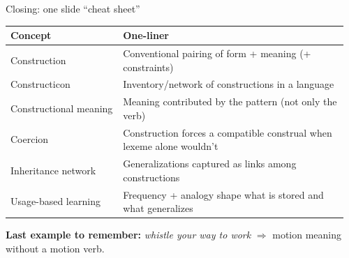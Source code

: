 \begin{frame}{Closing: one slide “cheat sheet”}
\small
\begin{tabular}{@{}p{0.32\linewidth}p{0.64\linewidth}@{}}
\toprule
\textbf{Concept} & \textbf{One-liner} \\
\midrule
Construction & Conventional pairing of form + meaning (+ constraints) \\
Constructicon & Inventory/network of constructions in a language \\
Constructional meaning & Meaning contributed by the pattern (not only the verb) \\
Coercion & Construction forces a compatible construal when lexeme alone wouldn’t \\
Inheritance network & Generalizations captured as links among constructions \\
Usage-based learning & Frequency + analogy shape what is stored and what generalizes \\
\bottomrule
\end{tabular}

\vspace{0.75em}
\textbf{Last example to remember:} \emph{whistle your way to work} $\Rightarrow$ motion meaning without a motion verb.
\end{frame}

